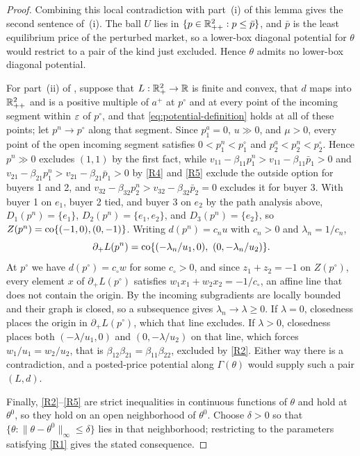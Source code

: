 \begin{proof}
Combining this local contradiction with part~\textup{(i)} of this lemma gives the second sentence of \,(i). The ball $U$ lies in $\{p\in\mathbb{R}_{++}^2:p\le\bar p\}$, and $\bar p$ is the least equilibrium price of the perturbed market, so a lower-box diagonal potential for $\theta$ would restrict to a pair of the kind just excluded. Hence $\theta$ admits no lower-box diagonal potential.

For part~(ii) of , suppose that $L:\mathbb{R}_+^2\to\mathbb{R}$ is finite and convex, that $d$ maps into $\mathbb{R}_{++}^2$ and is a positive multiple of $a^+$ at $p^\circ$ and at every point of the incoming segment within $\varepsilon$ of $p^\circ$, and that \eqref{eq:potential-definition} holds at all of these points; let $p^n\to p^\circ$ along that segment. Since $p^a_1=0$, $u\gg0$, and $\mu>0$, every point of the open incoming segment satisfies $0<p^n_1<p^\circ_1$ and $p^a_2<p^n_2<p^\circ_2$. Hence $p^n\gg0$ excludes $(1,1)$ by the first fact, while $v_{11}-\beta_{11}p^n_1>v_{11}-\beta_{11}\bar p_1>0$ and $v_{21}-\beta_{21}p^n_1>v_{21}-\beta_{21}\bar p_1>0$ by \ref{R4} and \ref{R5} exclude the outside option for buyers 1 and 2, and $v_{32}-\beta_{32}p^n_2>v_{32}-\beta_{32}\bar p_2=0$ excludes it for buyer 3. With buyer 1 on $e_1$, buyer 2 tied, and buyer 3 on $e_2$ by the path analysis above, $D_1(p^n)=\{e_1\}$, $D_2(p^n)=\{e_1,e_2\}$, and $D_3(p^n)=\{e_2\}$, so $Z(p^n)=\operatorname{co}\{(-1,0),(0,-1)\}$. Writing $d(p^n)=c_nu$ with $c_n>0$ and $\lambda_n=1/c_n$,
\[
\partial_+L(p^n)=\co\{(-\lambda_n/u_1,0),\ (0,-\lambda_n/u_2)\}.
\]
At $p^\circ$ we have $d(p^\circ)=c_\circ w$ for some $c_\circ>0$, and since $z_1+z_2=-1$ on $Z(p^\circ)$, every element $x$ of $\partial_+L(p^\circ)$ satisfies $w_1x_1+w_2x_2=-1/c_\circ$, an affine line that does not contain the origin. By  the incoming subgradients are locally bounded and their graph is closed, so a subsequence gives $\lambda_n\to\lambda\ge0$. If $\lambda=0$, closedness places the origin in $\partial_+L(p^\circ)$, which that line excludes. If $\lambda>0$, closedness places both $(-\lambda/u_1,0)$ and $(0,-\lambda/u_2)$ on that line, which forces $w_1/u_1=w_2/u_2$, that is $\beta_{12}\beta_{21}=\beta_{11}\beta_{22}$, excluded by \ref{R2}. Either way there is a contradiction, and a posted-price potential along $\Gamma(\theta)$ would supply such a pair $(L,d)$.

Finally, \ref{R2}--\ref{R5} are strict inequalities in continuous functions of $\theta$ and hold at $\theta^0$, so they hold on an open neighborhood of $\theta^0$. Choose $\delta>0$ so that $\{\theta:\lVert\theta-\theta^0\rVert_\infty\le\delta\}$ lies in that neighborhood; restricting to the parameters satisfying \ref{R1} gives the stated consequence.
\end{proof}

